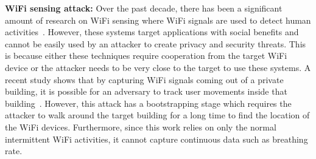 


\textbf{WiFi sensing attack:} Over the past decade, there has been a significant amount of research on WiFi sensing where WiFi signals are used to detect human activities~\cite{iot-wifi-localization, rf-sensing, wifi-sensing-survey,adib2015smart, breathing-rate-1, breathing-rate-2,gesture-recognition-1, gesture-recognition-2, gesture-recognition-3,pu2013whole}. However, these systems target applications with social benefits and cannot be easily used by an attacker to create privacy and security threats. This is because either these techniques require cooperation from the target WiFi device or the attacker needs to be very close to the target to use these systems. A recent study shows that by capturing WiFi signals coming out of a private building, it is possible for an adversary to track user movements inside that building~\cite{zhu2018tu}. However, this attack has a bootstrapping stage which requires the attacker to walk around the target building for a long time to find the location of the WiFi devices. Furthermore, since this work relies on only the normal intermittent WiFi activities, it cannot capture continuous data such as breathing rate.  

